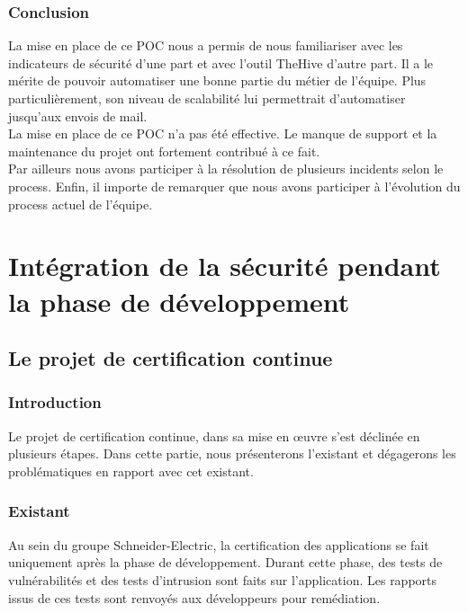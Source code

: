 \documentclass[a4paper,12pt]{book}
\theoremstyle{break}
\begin{document}
\section{Conclusion}
La mise en place de ce POC nous a permis de nous familiariser avec les indicateurs de sécurité d'une part et avec l'outil TheHive d'autre part. 
Il a le mérite de pouvoir automatiser une bonne partie du métier de l'équipe. Plus particulièrement, son niveau de scalabilité lui permettrait d'automatiser jusqu'aux envois de mail. 
\\La mise en place de ce POC n'a pas été effective. Le manque de support et la maintenance du projet ont fortement contribué à ce fait. 
\\Par ailleurs nous avons participer à la résolution de plusieurs incidents selon le process. 
Enfin, il importe de remarquer que nous avons participer à l'évolution du process actuel de l'équipe. 

\part{Intégration de la sécurité pendant la phase de développement}
\chapter{Le projet de certification continue}
\section{Introduction}
Le projet de certification continue, dans sa mise en  œuvre s'est déclinée en plusieurs étapes. Dans cette partie, nous présenterons l'existant et dégagerons les problématiques en rapport avec cet existant.

\section{Existant}
Au sein du groupe Schneider-Electric, la certification des applications se fait uniquement après la phase de développement. Durant cette phase, des tests de vulnérabilités et des tests d'intrusion sont faits sur l'application. Les rapports issus de ces tests sont renvoyés aux développeurs pour remédiation. 
\end{document}

